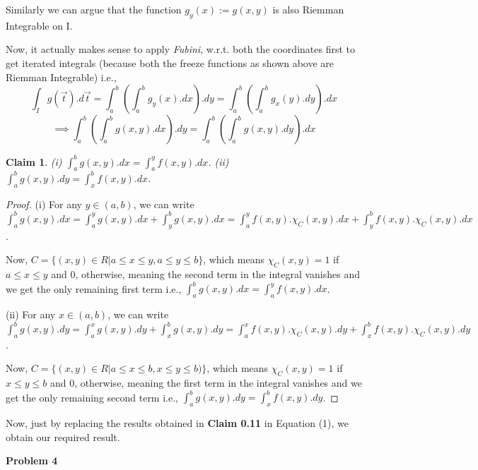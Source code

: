 \documentclass[12pt,a4paper]{article}
\newtheorem{claim}[theorem]{Claim}
\theoremstyle{definition}
\begin{document}
\begin{flushleft}
Similarly we can argue that the function $g_y (x) := g(x,y)$ is also Riemman Integrable on I.

\medskip

Now, it actually makes sense to apply {\it Fubini}, w.r.t. both the coordinates first to get iterated integrals (because both the freeze functions as shown above are Riemman Integrable) i.e., $$\int_{I} g(\vec{t}).d\vec{t} = \int_{a}^{b} (\int_{a}^{b} g_y (x).dx).dy = \int_{a}^{b} (\int_{a}^{b} g_x (y).dy).dx $$ 
\begin{equation}
	\implies \int_{a}^{b} (\int_{a}^{b} g(x,y).dx).dy = \int_{a}^{b} (\int_{a}^{b} g(x,y).dy).dx
\end{equation}

\begin{claim}
	(i) $\int_{a}^{b} g(x,y).dx = \int_{a}^{y} f(x,y).dx$.
	\smallskip
	(ii) $\int_{a}^{b} g(x,y).dy = \int_{x}^{b} f(x,y).dx$.
\end{claim}

\begin{proof}
	(i) For any $y \in (a,b)$, we can write $\int_{a}^{b} g(x,y).dx = \int_{a}^{y} g(x,y).dx + \int_{y}^{b} g(x,y).dx = \int_{a}^{y} f(x,y).\chi_{C} (x,y).dx + \int_{y}^{b} f(x,y).\chi_{C} (x,y).dx$.

	\medskip

	Now, $C =  \{(x, y) \in R | a \le x \le y , a \le y \le b\}$, which means $\chi_{C} (x,y) = 1$ if $a \le x \le y$ and $0$, otherwise, meaning the second term in the integral vanishes and we get the only remaining first term i.e., $\int_{a}^{b} g(x,y).dx = \int_{a}^{y} f(x,y).dx$.

	\bigskip

	(ii) For any $x \in (a,b)$, we can write $\int_{a}^{b} g(x,y).dy = \int_{a}^{x} g(x,y).dy + \int_{x}^{b} g(x,y).dy = \int_{a}^{x} f(x,y).\chi_{C} (x,y).dy + \int_{x}^{b} f(x,y).\chi_{C} (x,y).dy$.

	\medskip

	Now, $C =  \{(x, y) \in R | a \le x \le b , x \le y \le b)\}$, which means $\chi_{C} (x,y) = 1$ if $x \le y \le b$ and $0$, otherwise, meaning the first term in the integral vanishes and we get the only remaining second term i.e., $\int_{a}^{b} g(x,y).dy = \int_{x}^{b} f(x,y).dy$.
\end{proof}

Now, just by replacing the results obtained in {\bf Claim 0.11} in Equation (1), we obtain our required result.
\newpage

{\bf  Problem 4}


\end{flushleft}
\end{document}

